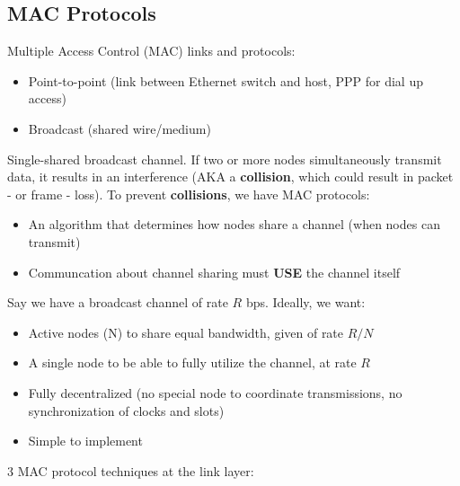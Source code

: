 \documentclass{article}
\begin{document}
\subsection{MAC Protocols}
Multiple Access Control (MAC) links and protocols:
\begin{itemize}
    \item Point-to-point (link between Ethernet switch and host, PPP for dial up access)
    \item Broadcast (shared wire/medium)
\end{itemize}
Single-shared broadcast channel. If two or more nodes simultaneously transmit data, it results
in an interference (AKA a \textbf{collision}, which could result in packet - or frame - loss). To
prevent \textbf{collisions}, we have MAC protocols:
\begin{itemize}
    \item An algorithm that determines how nodes share a channel (when nodes can transmit)
    \item Communcation about channel sharing must \textbf{USE} the channel itself
\end{itemize}
Say we have a broadcast channel of rate $R$ bps. Ideally, we want:
\begin{itemize}
    \item Active nodes (N) to share equal bandwidth, given of rate $R/N$
    \item A single node to be able to fully utilize the channel, at rate $R$
    \item Fully decentralized (no special node to coordinate transmissions, no synchronization of
    clocks and slots)
    \item Simple to implement
\end{itemize}
3 MAC protocol techniques at the link layer:

\end{document}
